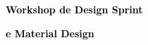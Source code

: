 \documentclass{article}
\begin{document}
	\color{textGray}
	\vspace*{70pt} %
	\Huge
	\BgThispage
		\textcolor{black}{\textbf{Workshop de Design Sprint}}

		\textcolor{black}{\textbf{e Material Design}}
	\BgThispage
	\vspace*{20pt}

	

	

	

	

	
\end{document}
